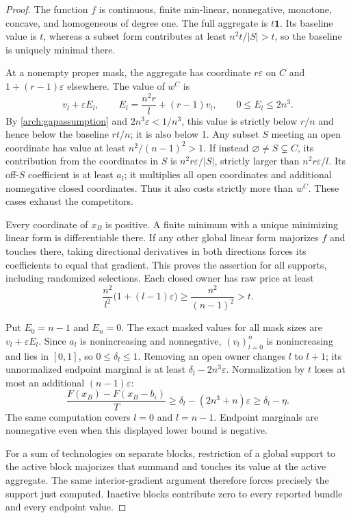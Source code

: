 \documentclass[11pt]{article}
\theoremstyle{definition}\newtheorem{definition}[theorem]{Definition}
\theoremstyle{remark}\newtheorem{remark}[theorem]{Remark}
\begin{document}
\begin{proof}
The function $f$ is continuous, finite min-linear, nonnegative, monotone,
concave, and homogeneous of degree one. The full aggregate is $t\mathbf1$.
Its baseline value is $t$, whereas a subset form contributes at least
$n^2t/|S|>t$, so the baseline is uniquely minimal there.

At a nonempty proper mask, the aggregate has coordinate $r\varepsilon$ on
$C$ and $1+(r-1)\varepsilon$ elsewhere. The value of $w^C$ is
\begin{equation}\label{arch:maskedvalue}
 v_l+\varepsilon E_l,
 \qquad E_l=\frac{n^2r}{l}+(r-1)v_l,
 \qquad 0\le E_l\le2n^3.
\end{equation}
By \eqref{arch:gapassumption} and $2n^3\varepsilon<1/n^3$, this value is
strictly below $r/n$ and hence below the baseline $rt/n$; it is also below 1.
Any subset $S$ meeting an open coordinate has value at least
$n^2/(n-1)^2>1$. If instead $\varnothing\ne S\subsetneq C$, its contribution
from the coordinates in $S$ is $n^2r\varepsilon/|S|$, strictly larger than
$n^2r\varepsilon/l$. Its off-$S$ coefficient is at least $a_l$; it multiplies
all open coordinates and additional nonnegative closed coordinates. Thus it
also costs strictly more than $w^C$. These cases exhaust the competitors.

Every coordinate of $x_B$ is positive. A finite minimum with a unique
minimizing linear form is differentiable there. If any other global linear
form majorizes $f$ and touches there, taking directional derivatives in both
directions forces its coefficients to equal that gradient. This proves the
assertion for all supports, including randomized selections. Each closed
owner has raw price at least
\[
 \frac{n^2}{l^2}\bigl(1+(l-1)\varepsilon\bigr)
 \ge\frac{n^2}{(n-1)^2}>t.
\]

Put $E_0=n-1$ and $E_n=0$. The exact masked values for all mask sizes are
$v_l+\varepsilon E_l$. Since $a_l$ is nonincreasing and nonnegative,
$(v_l)_{l=0}^n$ is nonincreasing and lies in $[0,1]$, so
$0\le\delta_l\le1$. Removing an open owner changes $l$ to $l+1$; its
unnormalized endpoint marginal is at least $\delta_l-2n^3\varepsilon$.
Normalization by $t$ loses at most an additional $(n-1)\varepsilon$:
\[
 \frac{F(x_B)-F(x_B-b_i)}{T}
 \ge\delta_l-(2n^3+n)\varepsilon
 \ge\delta_l-\eta.
\]
The same computation covers $l=0$ and $l=n-1$. Endpoint marginals are
nonnegative even when this displayed lower bound is negative.

For a sum of technologies on separate blocks, restriction of a global
support to the active block majorizes that summand and touches its value
at the active aggregate. The same interior-gradient argument therefore
forces precisely the support just computed. Inactive blocks contribute
zero to every reported bundle and every endpoint value.
\end{proof}
\end{document}
